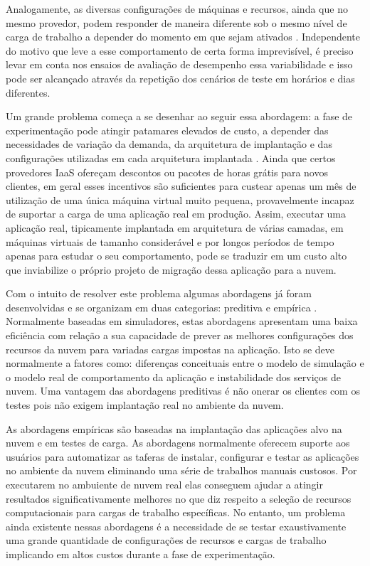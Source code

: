 Analogamente, as diversas configurações de máquinas e recursos, ainda que no mesmo 
provedor, podem responder de maneira diferente sob o mesmo nível de carga de 
trabalho a depender do momento em que sejam ativados \cite{cunha2011investigating, 
iosup2011performance, jayasinghe2011variations}. Independente do motivo que leve 
a esse comportamento de certa forma imprevisível, é preciso levar em conta nos 
ensaios de avaliação de desempenho essa variabilidade e isso pode ser alcançado 
através da repetição dos cenários de teste em horários e dias diferentes.

Um grande problema começa a se desenhar ao seguir essa abordagem: a fase de
experimentação pode atingir patamares elevados de custo, a depender das
necessidades de variação da demanda, da arquitetura de implantação e das 
configurações utilizadas em cada arquitetura implantada \cite{silva2013cloudbench}. 
Ainda que certos provedores IaaS ofereçam descontos ou pacotes de horas grátis 
para novos clientes, em geral esses incentivos são suficientes para custear apenas 
um mês de utilização de uma única máquina virtual muito pequena, provavelmente 
incapaz de suportar a carga de uma aplicação real em produção. Assim, executar 
uma aplicação real, tipicamente implantada em arquitetura de várias camadas, em 
máquinas virtuais de tamanho considerável e por longos períodos de tempo apenas 
para estudar o seu comportamento, pode se traduzir em um custo alto que inviabilize 
o próprio projeto de migração dessa aplicação para a nuvem. 

Com o intuito de resolver este problema algumas abordagens já
foram desenvolvidas e se organizam em duas categorias: preditiva \cite{cloudharmony,
malkowski2010cloudxplor, fittkau2012cdosim, li2011cloudprophet} e empírica 
\cite{jayasinghe2012, silva2013cloudbench, cunhacloud, scheuner2014cloud}.
Normalmente baseadas em simuladores, estas abordagens apresentam uma baixa
eficiência \cite{fittkau2012cdosim} com relação a sua capacidade de prever as
melhores configurações dos recursos da nuvem para variadas cargas impostas na 
aplicação. Isto se deve normalmente a fatores como: diferenças conceituais entre 
o modelo de simulação e o modelo real de comportamento da aplicação e instabilidade 
dos serviços de nuvem. Uma vantagem das abordagens preditivas é não onerar os 
clientes com os testes pois não exigem implantação real no ambiente da nuvem.

As abordagens empíricas são baseadas na implantação das aplicações alvo na nuvem 
e em testes de carga. As abordagens normalmente oferecem suporte aos usuários
para automatizar as taferas de instalar, configurar e testar as aplicações no
ambiente da nuvem eliminando uma série de trabalhos manuais custosos. Por
executarem no ambuiente de nuvem real elas conseguem ajudar a atingir resultados
significativamente melhores no que diz respeito a seleção de recursos
computacionais para cargas de trabalho específicas. No entanto, um problema ainda 
existente nessas abordagens é a necessidade de se testar exaustivamente uma grande 
quantidade de configurações de recursos e cargas de trabalho implicando em altos 
custos durante a fase de experimentação.

